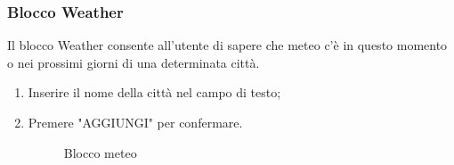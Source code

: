 \subsubsection{Blocco Weather}
Il blocco Weather consente all'utente di sapere che meteo c'è in questo momento o nei prossimi giorni di una determinata città.
\begin{enumerate}
	\item Inserire il nome della città nel campo di testo;
	\item Premere "AGGIUNGI" per confermare.
	\begin{figure}[!ht]
		\centering
		\caption{Blocco meteo}
	\end{figure}
\end{enumerate}


